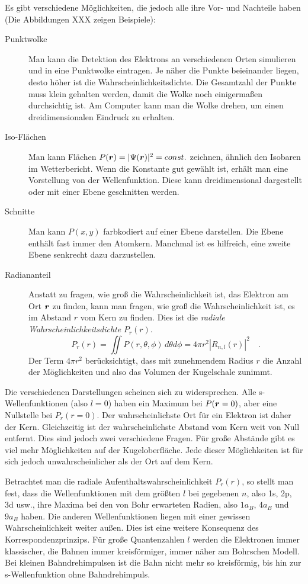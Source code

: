 Es gibt verschiedene Möglichkeiten, die jedoch alle ihre Vor- und Nachteile haben (Die Abbildungen XXX zeigen Beispiele):
\begin{description}
    \item[Punktwolke] Man kann die Detektion des Elektrons an verschiedenen Orten simulieren und in eine Punktwolke eintragen. Je näher die Punkte beieinander liegen, desto höher ist die Wahrscheinlichkeitsdichte. Die Gesamtzahl der Punkte muss klein gehalten werden, damit die Wolke noch einigermaßen durchsichtig ist. Am Computer kann man die Wolke drehen, um einen dreidimensionalen Eindruck zu erhalten.
    \item[Iso-Flächen] Man kann Flächen $P(\boldsymbol{r}) = |\Psi(\boldsymbol{r})|^2 = const.$ zeichnen, ähnlich den Isobaren im Wetterbericht. Wenn die Konstante gut gewählt ist, erhält man eine Vorstellung von der Wellenfunktion. Diese kann dreidimensional dargestellt oder mit einer Ebene geschnitten werden.
    \item[Schnitte] Man kann $P(x,y)$ farbkodiert auf einer Ebene darstellen. Die Ebene enthält fast immer den Atomkern. Manchmal ist es hilfreich, eine zweite Ebene senkrecht dazu darzustellen.
    \item[Radiananteil] Anstatt zu fragen, wie groß die Wahrscheinlichkeit ist, das Elektron am Ort $\boldsymbol{r}$ zu finden, kann man fragen, wie groß die Wahrscheinlichkeit ist, es im Abstand $r$ vom Kern zu finden. Dies ist die \emph{radiale Wahrscheinlichkeitsdichte} $P_r(r)$.
    \begin{equation}
        P_r(r) = \iint P(r, \theta, \phi) \, d\theta d\phi = 4 \pi r^2 |R_{n,l}(r)|^2 \quad .
    \end{equation}
    Der Term $4 \pi r^2$ berücksichtigt, dass mit zunehmendem Radius $r$ die Anzahl der Möglichkeiten und also das Volumen der Kugelschale zunimmt.
\end{description}


Die verschiedenen Darstellungen scheinen sich zu widersprechen. Alle s-Wellenfunktionen (also $l=0$) haben ein Maximum bei $P(\boldsymbol{r} = 0)$, aber eine Nullstelle bei $P_r(r=0)$. Der wahrscheinlichste Ort für ein Elektron ist daher der Kern. Gleichzeitig ist der wahrscheinlichste Abstand vom Kern weit von Null entfernt.  Dies sind jedoch zwei verschiedene Fragen.  Für große Abstände gibt es viel mehr Möglichkeiten auf der Kugeloberfläche. Jede dieser Möglichkeiten ist für sich jedoch unwahrscheinlicher als der Ort auf dem Kern.


Betrachtet man die radiale Aufenthaltswahrscheinlichkeit $P_r(r)$, so stellt man fest, dass die Wellenfunktionen mit dem größten $l$ bei gegebenen $n$, also 1s, 2p, 3d usw., ihre Maxima bei den von Bohr erwarteten Radien, also $1 a_B$, $4 a_B$ und $9 a_B$ haben. Die anderen Wellenfunktionen liegen mit einer gewissen Wahrscheinlichkeit weiter außen. Dies ist eine weitere Konsequenz des Korrespondenzprinzips. Für große Quantenzahlen $l$ werden die Elektronen immer klassischer, die Bahnen immer kreisförmiger, immer näher am Bohrschen Modell. Bei kleinen Bahndrehimpulsen ist die Bahn nicht mehr so kreisförmig, bis hin zur s-Wellenfunktion ohne Bahndrehimpuls.


